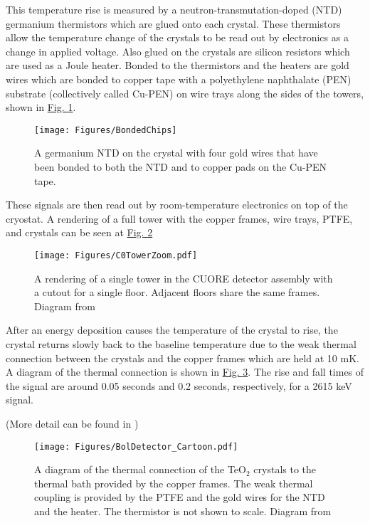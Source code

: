 \documentclass[12pt,a4paper]{article}
\begin{document}
This temperature rise is measured by a neutron-transmutation-doped (NTD) germanium thermistors which are glued onto each crystal. These thermistors allow the temperature change of the crystals to be read out by electronics as a change in applied voltage. Also glued on the crystals are silicon resistors which are used as a Joule heater. Bonded to the thermistors and the heaters are gold wires which are bonded to copper tape with a polyethylene naphthalate (PEN) substrate (collectively called Cu-PEN) on wire trays along the sides of the towers, shown in \hyperref[fig:bondedchips]{Fig. \ref*{fig:bondedchips}}.
\begin{figure}[htbp]
\centering
\texttt{[image: Figures/BondedChips]}
\caption{A germanium NTD on the crystal with four gold wires that have been bonded to both the NTD and to copper pads on the Cu-PEN tape.}
\label{fig:bondedchips}
\end{figure}
These signals are then read out by room-temperature electronics on top of the cryostat. A rendering of a full tower with the copper frames, wire trays, PTFE, and crystals can be seen at \hyperref[fig:SingleTowerWithZoom]{Fig. \ref*{fig:SingleTowerWithZoom}}

\begin{figure}[htbp]
\centering
\texttt{[image: Figures/C0TowerZoom.pdf]}
\caption[A rendering of a single tower in the CUORE detector assembly with a cutout for a single floor. Adjacent floors share the same frames.]{A rendering of a single tower in the CUORE detector assembly with a cutout for a single floor. Adjacent floors share the same frames. Diagram from \cite{Alduino:2016vjd}}
\label{fig:SingleTowerWithZoom}
\end{figure}

After an energy deposition causes the temperature of the crystal to rise, the crystal returns slowly back to the baseline temperature due to the weak thermal connection between the crystals and the copper frames which are held at 10 mK. A diagram of the thermal connection is shown in \hyperref[fig:thermal_crystal_cartoon]{Fig. \ref*{fig:thermal_crystal_cartoon}}. The rise and fall times of the signal are around 0.05 seconds and 0.2 seconds, respectively, for a 2615 keV signal.

(\color{yellow}More detail can be found in \cite{Alduino:2016vjd}\color{black})

\begin{figure}[htbp]
\centering
\texttt{[image: Figures/BolDetector\_Cartoon.pdf]}
\caption[A diagram of the thermal connection of the TeO$_2$ crystals to the thermal bath provided by the copper frames. The weak thermal coupling is provided by the PTFE and the gold wires for the NTD and the heater. The thermistor is not shown to scale.]{A diagram of the thermal connection of the TeO$_2$ crystals to the thermal bath provided by the copper frames. The weak thermal coupling is provided by the PTFE and the gold wires for the NTD and the heater. The thermistor is not shown to scale. Diagram from \cite{Alduino:2016vjd}}
\label{fig:thermal_crystal_cartoon}
\end{figure}
\end{document}

